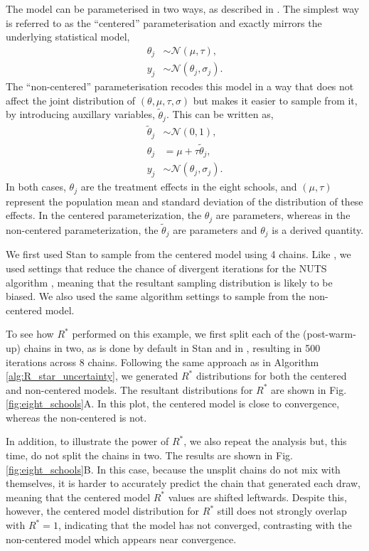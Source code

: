 \documentclass{article}
\newcommand{\N}{\mathcal{N}}
\begin{document}
The model can be parameterised in two ways, as described in \cite{vehtari2019rank}. The simplest way is referred to as the ``centered'' parameterisation and exactly mirrors the underlying statistical model,
%
\begin{align*}
\theta_j &\sim \N(\mu, \tau), \\
y_j &\sim \N(\theta_j, \sigma_j).
\end{align*}
%
The ``non-centered'' parameterisation recodes this model in a way that does not affect the joint distribution of $(\theta, \mu, \tau, \sigma)$ but makes it easier to sample from it, by introducing auxillary variables, $\tilde \theta_j$. This can be written as,
%
\begin{align*}
\tilde{\theta}_j &\sim \N(0, 1), \\
\theta_j &= \mu + \tau \tilde{\theta}_j,\\
y_j &\sim \N(\theta_j, \sigma_j).
\end{align*}
%
In both cases, $\theta_j$ are the treatment effects in the eight schools, and $(\mu, \tau)$ represent the population mean and standard deviation 
of the distribution of these effects. In the centered parameterization, the $\theta_j$ are parameters, whereas in the non-centered parameterization, the $\tilde{\theta}_j$ are parameters and $\theta_j$ is a derived quantity.

We first used Stan \citep{carpenter2017stan} to sample from the centered model using 4 chains. Like \cite{vehtari2019rank}, we used settings that reduce the chance of divergent iterations for the NUTS algorithm \citep{betancourt2017conceptual}, meaning that the resultant sampling distribution is likely to be biased. We also used the same algorithm settings to sample from the non-centered model.

To see how $R^*$ performed on this example, we first split each of the (post-warm-up) chains in two, as is done by default in Stan \citep{carpenter2017stan} and in \cite{vehtari2019rank}, resulting in 500 iterations across 8 chains. Following the same approach as in Algorithm \ref{alg:R_star_uncertainty}, we generated $R^*$ distributions for both the centered and non-centered models. The resultant distributions for $R^*$ are shown in Fig.\ref{fig:eight_schools}A. In this plot, the centered model is close to convergence, whereas the non-centered is not.

In addition, to illustrate the power of $R^*$, we also repeat the analysis but, this time, do not split the chains in two. The results are shown in Fig.\ref{fig:eight_schools}B. In this case, because the unsplit chains do not mix with themselves, it is harder to accurately predict the chain that generated each draw, meaning that the centered model $R^*$ values are shifted leftwards. Despite this, however, the centered model distribution for $R^*$ still does not strongly overlap with $R^*=1$, indicating that the model has not converged, contrasting with the non-centered model which appears near convergence.
\end{document}

